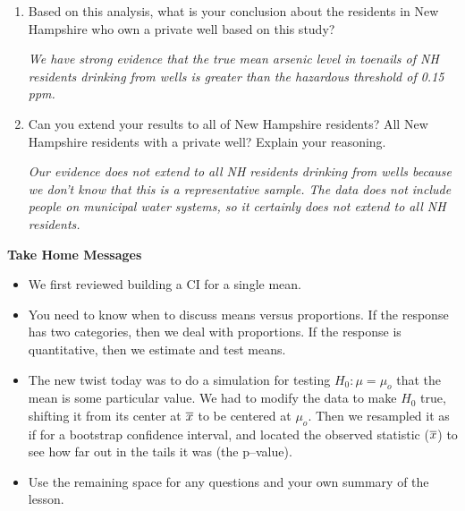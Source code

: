 \begin{enumerate}
\begin{key}
  {\it 0.016*3000 = 48}
\end{key}



{\bf Step 5: Formulate conclusions.}


\item Based on this analysis, what is your conclusion about the
  residents in New Hampshire who own a private well based on this
  study?
\begin{students}
  \vspace{2cm}
\end{students}

\begin{key}
  {\it We have strong evidence that the true mean arsenic level in
    toenails of NH residents drinking from wells is greater than the
    hazardous threshold of 0.15 ppm.} 
\end{key}
\item Can you extend your results to all of New Hampshire residents?
  All New Hampshire residents with a private well?  Explain your
  reasoning.
\begin{students}
  \newpage
\end{students}

\begin{key}
  {\it Our evidence does not extend to all NH residents drinking from
    wells because we don't know that this is a representative sample.
   The data does not include people on municipal water systems, so it
   certainly does not extend to all NH residents.} 
\end{key}

\end{enumerate}

\begin{center}
  {\bf Take Home Messages}\vspace{-.1in}
\end{center}

\begin{itemize}
\item We first reviewed building a CI for a single mean.
\item You need to know when to discuss means versus proportions.  If
  the response has two categories, then we deal with proportions.  If
  the response is quantitative, then we estimate and test means.
\item The new twist today was to do a simulation for testing $H_0: \mu
  = \mu_o$ that the mean is some particular value.  We had to modify
  the data to make $H_0$ true, shifting it from its center at $\overline{x}$ to
  be centered at $\mu_o$.  Then we resampled it as if for a bootstrap
  confidence interval, and located the observed statistic ($\overline{x}$) to
  see how far out in the tails it was (the p--value).

 \item 
  Use the remaining space for any questions and your own summary of the
  lesson. 

\end{itemize}

